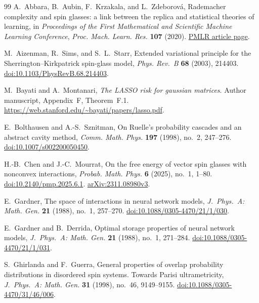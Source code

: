 \documentclass[11pt]{article}
\numberwithin{equation}{section}
\theoremstyle{definition}
\begin{document}
\begin{thebibliography}{99}
A.~Abbara, B.~Aubin, F.~Krzakala, and L.~Zdeborov\'a,
Rademacher complexity and spin glasses: a link between the replica and statistical theories of learning,
in \emph{Proceedings of the First Mathematical and Scientific Machine Learning Conference},
\emph{Proc. Mach. Learn. Res.} \textbf{107} (2020).
\href{https://proceedings.mlr.press/v107/abbaras20a.html}{PMLR article page}.

M.~Aizenman, R.~Sims, and S.~L.~Starr, Extended variational principle for the Sherrington--Kirkpatrick spin-glass model,
\emph{Phys. Rev.~B} \textbf{68} (2003), 214403.
\href{https://doi.org/10.1103/PhysRevB.68.214403}{doi:10.1103/PhysRevB.68.214403}.

M.~Bayati and A.~Montanari, \emph{The LASSO risk for gaussian matrices}.
Author manuscript, Appendix~F, Theorem~F.1.
\url{https://web.stanford.edu/~bayati/papers/lasso.pdf}.

E.~Bolthausen and A.-S.~Sznitman, On Ruelle's probability cascades and an abstract cavity method,
\emph{Comm. Math. Phys.} \textbf{197} (1998), no.~2, 247--276.
\href{https://doi.org/10.1007/s002200050450}{doi:10.1007/s002200050450}.

H.-B.~Chen and J.-C.~Mourrat, On the free energy of vector spin glasses with nonconvex interactions,
\emph{Probab. Math. Phys.} \textbf{6} (2025), no.~1, 1--80.
\href{https://doi.org/10.2140/pmp.2025.6.1}{doi:10.2140/pmp.2025.6.1}.
\href{https://arxiv.org/abs/2311.08980v3}{arXiv:2311.08980v3}.

E.~Gardner, The space of interactions in neural network models,
\emph{J.~Phys.~A: Math. Gen.} \textbf{21} (1988), no.~1, 257--270.
\href{https://doi.org/10.1088/0305-4470/21/1/030}{doi:10.1088/0305-4470/21/1/030}.

E.~Gardner and B.~Derrida, Optimal storage properties of neural network models,
\emph{J.~Phys.~A: Math. Gen.} \textbf{21} (1988), no.~1, 271--284.
\href{https://doi.org/10.1088/0305-4470/21/1/031}{doi:10.1088/0305-4470/21/1/031}.

S.~Ghirlanda and F.~Guerra, General properties of overlap probability distributions in disordered spin systems. Towards Parisi ultrametricity,
\emph{J.~Phys.~A: Math. Gen.} \textbf{31} (1998), no.~46, 9149--9155.
\href{https://doi.org/10.1088/0305-4470/31/46/006}{doi:10.1088/0305-4470/31/46/006}.


\end{thebibliography}
\end{document}
